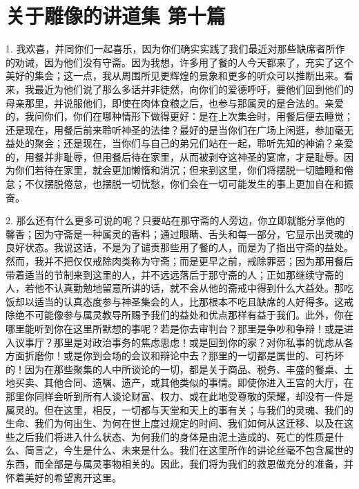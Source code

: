 

\section{关于雕像的讲道集 第十篇}

\par

1. 我欢喜，并同你们一起喜乐，因为你们确实实践了我们最近对那些缺席者所作的劝诫，因为他们没有守斋。因为我想，许多用了餐的人今天都来了，充实了这个美好的集会；这一点，我从周围所见更辉煌的景象和更多的听众可以推断出来。看来，我最近为他们说了那么多话并非徒然，向你们的爱德呼吁，要他们回到他们的母亲那里，并说服他们，即使在肉体食粮之后，也参与那属灵的是合法的。亲爱的，我问你们，你们在哪种情形下做得更好：是在上次集会时，用餐后便去睡觉；还是现在，用餐后前来聆听神圣的法律？最好的是当你们在广场上闲逛，参加毫无益处的聚会；还是现在，当你们与自己的弟兄们站在一起，聆听先知的神谕？亲爱的，用餐并非耻辱，但用餐后待在家里，从而被剥夺这神圣的宴席，才是耻辱。因为你们若待在家里，就会更加懒惰和消沉；但来到这里，你们将摆脱一切瞌睡和倦怠；不仅摆脱倦怠，也摆脱一切忧愁，你们会在一切可能发生的事上更加自在和振奋。\par

2. 那么还有什么更多可说的呢？只要站在那守斋的人旁边，你立即就能分享他的馨香；因为守斋是一种属灵的香料；通过眼睛、舌头和每一部分，它显示出灵魂的良好状态。我说这话，不是为了谴责那些用了餐的人，而是为了指出守斋的益处。然而，我并不把仅仅戒除肉类称为守斋；而是更早之前，戒除罪恶；因为那用餐后带着适当的节制来到这里的人，并不远远落后于那守斋的人；正如那继续守斋的人，若他不认真勤勉地留意所讲的话，就不会从他的斋戒中得到什么大益处。那吃饭却以适当的认真态度参与神圣集会的人，比那根本不吃且缺席的人好得多。这戒除绝不可能像参与属灵教导所赐予我们的益处和优点那样有益于我们。此外，你在哪里能听到你在这里所默想的事呢？若是你去审判台？那里是争吵和争辩！或是进入议事厅？那里是对政治事务的焦虑思虑！或是回到你的家？对你私事的忧虑从各方面折磨你！或是你到会场的会议和辩论中去？那里的一切都是属世的、可朽坏的！因为在那些聚集的人中所谈论的一切，都是关于商品、税务、丰盛的餐桌、土地买卖、其他合同、遗嘱、遗产，或其他类似的事情。即使你进入王宫的大厅，在那里你同样会听到所有人谈论财富、权力、或在此地受尊敬的荣耀，却没有一件是属灵的。但在这里，相反，一切都与天堂和天上的事有关；与我们的灵魂、我们的生命、我们为何出生、为何在世上度过规定的时间、我们如何从这迁移、以及在这些之后我们将进入什么状态、为何我们的身体是由泥土造成的、死亡的性质是什么、简言之，今生是什么、未来是什么。我们在这里所作的讲论丝毫不包含属世的东西，而全部是与属灵事物相关的。因此，我们将为我们的救恩做充分的准备，并怀着美好的希望离开这里。\par

